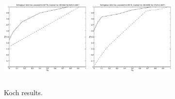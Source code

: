 \documentclass[12pt]{article}
\begin{document}
\begin{figure}[p]
        \includegraphics[height=4.5cm,width=4.5cm]{plot16.eps}
        \includegraphics[height=4.5cm,width=4.5cm]{plot20.eps}
        \caption{Koch results.}
\end{figure}
\end{document}
